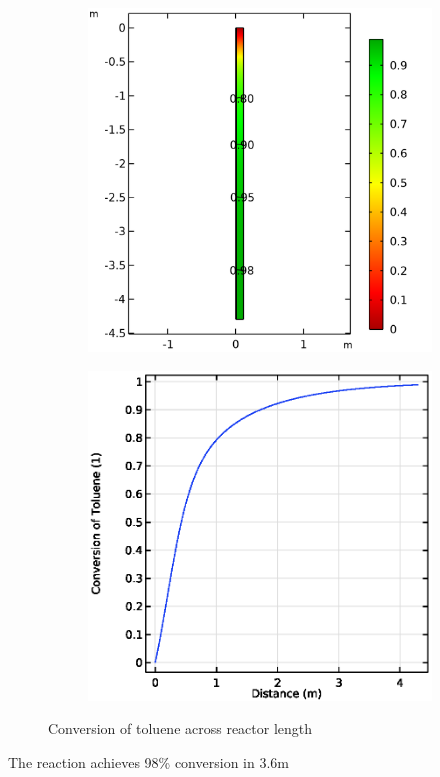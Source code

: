 \begin{figure}[h]
    \centering

    \begin{subfigure}{0.49\linewidth}
        \includegraphics[width=\linewidth, scale=0.5]{figures/conversion-surface.png}

        \label{fig:comsol-conversion:surface}
    \end{subfigure}
    \begin{subfigure}{0.49\linewidth}
        \includegraphics[width=\linewidth, scale=0.5]{figures/conversion-line.eps}

        \label{fig:comsol-conversion:line}
    \end{subfigure}

    \caption{Conversion of toluene across reactor length}
    \label{fig:comsol-conversion}
\end{figure}
The reaction achieves 98\% conversion in 3.6m 

